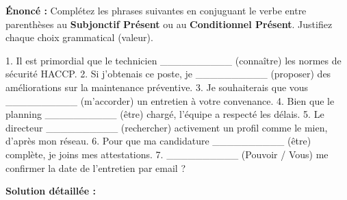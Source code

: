 \documentclass[11pt]{article}
\begin{document}
\begin{exoresolu}
\textbf{Énoncé :} Complétez les phrases suivantes en conjuguant le verbe entre parenthèses au \textbf{Subjonctif Présent} ou au \textbf{Conditionnel Présent}. Justifiez chaque choix grammatical (valeur).

1. Il est primordial que le technicien \_\_\_\_\_\_\_\_\_\_ (connaître) les normes de sécurité HACCP.
2. Si j'obtenais ce poste, je \_\_\_\_\_\_\_\_\_\_ (proposer) des améliorations sur la maintenance préventive.
3. Je souhaiterais que vous \_\_\_\_\_\_\_\_\_\_ (m'accorder) un entretien à votre convenance.
4. Bien que le planning \_\_\_\_\_\_\_\_\_\_ (être) chargé, l'équipe a respecté les délais.
5. Le directeur \_\_\_\_\_\_\_\_\_\_ (rechercher) activement un profil comme le mien, d'après mon réseau.
6. Pour que ma candidature \_\_\_\_\_\_\_\_\_\_ (être) complète, je joins mes attestations.
7. \_\_\_\_\_\_\_\_\_\_ (Pouvoir / Vous) me confirmer la date de l'entretien par email ?

\tcblower
\textbf{Solution détaillée :}


\end{exoresolu}
\end{document}
